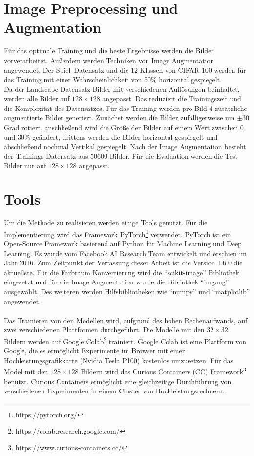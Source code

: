\section{Image Preprocessing und Augmentation}
Für das optimale Training und die beste Ergebnisse werden die Bilder vorverarbeitet. Außerdem werden Techniken von Image Augmentation angewendet.
Der Spiel–Datensatz und die 12 Klassen von CIFAR-100 werden für das Training mit einer Wahrscheinlichkeit von 50\% horizontal gespiegelt.
\\
Da der Landscape Datensatz Bilder mit verschiedenen Auflösungen beinhaltet, werden alle Bilder auf $ 128 \times 128 $ angepasst. Das 
reduziert die Trainingszeit und die Komplexität des Datensatzes. 
Für das Training werden pro Bild 4 zusätzliche augmentierte Bilder generiert. Zunächst werden die Bilder zufälligerweise um $\pm 30$ Grad rotiert,
anschließend wird die Größe der Bilder auf einem Wert zwischen 0 und 30\% geändert, %
drittens werden die Bilder horizontal gespiegelt und abschließend nochmal Vertikal gespiegelt. 
Nach der Image Augmentation besteht der Trainings Datensatz aus 50600 Bilder.
Für die Evaluation werden die Test Bilder nur auf $ 128 \times 128 $ angepasst.

\section{Tools}
Um die Methode zu realisieren werden einige Tools genutzt. Für die Implementierung wird das Framework 
PyTorch\footnote{https://pytorch.org/}\label{tool:pytorch} verwendet. PyTorch ist ein Open-Source Framework basierend auf Python für Machine Learning und 
Deep Learning. Es wurde vom Facebook AI Research Team entwickelt und erschien im Jahr 2016. Zum Zeitpunkt der Verfassung dieser Arbeit ist 
die Version 1.6.0 die aktuellste. Für die Farbraum Konvertierung wird die ``scikit-image'' Bibliothek eingesetzt und für die Image Augmentation 
wurde die Bibliothek ``imgaug'' ausgewählt. Des weiteren werden Hilfsbibliotheken wie ``numpy'' und ``matplotlib'' angewendet.
\\
\\
Das Trainieren von den Modellen wird, aufgrund des hohen Rechenaufwands, auf zwei verschiedenen Plattformen durchgeführt. Die Modelle mit den
$32 \times 32$ Bildern werden auf Google Colab\footnote{https://colab.research.google.com/} trainiert. Google Colab ist eine Plattform von 
Google, die es ermöglicht Experimente im Browser mit einer Hochleistungsgrafikkarte (Nvidia Tesla P100) kostenlos umzusetzen. Für das Model mit den 
$128 \times 128$ Bildern
wird das Curious Containers (CC) Framework\footnote{https://www.curious-containers.cc/} benutzt. Curious Containers ermöglicht eine 
gleichzeitige Durchführung von verschiedenen Experimenten in einem Cluster von Hochleistungsrechnern.


